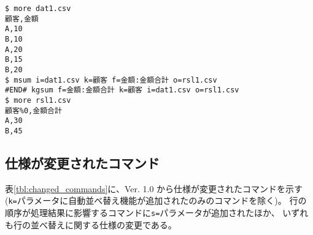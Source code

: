 \begin{Verbatim}[baselinestretch=0.7,frame=single]
$ more dat1.csv
顧客,金額
A,10
B,10
A,20
B,15
B,20
$ msum i=dat1.csv k=顧客 f=金額:金額合計 o=rsl1.csv
#END# kgsum f=金額:金額合計 k=顧客 i=dat1.csv o=rsl1.csv
$ more rsl1.csv
顧客%0,金額合計
A,30
B,45
\end{Verbatim}
%

\subsection{仕様が変更されたコマンド\label{sect:changedcommands}}

表\ref{tbl:changed_commands}に、Ver. 1.0 から仕様が変更されたコマンドを示す
(\verb|k=|パラメータに自動並べ替え機能が追加されたのみのコマンドを除く)。
行の順序が処理結果に影響するコマンドに\verb|s=|パラメータが追加されたほか、
いずれも行の並べ替えに関する仕様の変更である。

